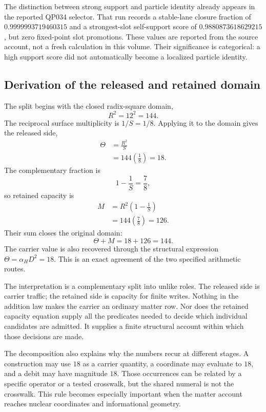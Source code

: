 The distinction between strong support and particle identity already appears in the reported QP034 selector. That run records a stable-lane closure fraction of $0.9999993719460315$ and a strongest-slot self-support score of $0.9880873618629215$, but zero fixed-point slot promotions. These values are reported from the source account, not a fresh calculation in this volume. Their significance is categorical: a high support score did not automatically become a localized particle identity.\cite{viireview}

\subsection{Derivation of the released and retained domain}

The split begins with the closed radix-square domain,
\begin{equation}
R^2=12^2=144.
\end{equation}
The reciprocal surface multiplicity is $1/S=1/8$. Applying it to the domain gives the released side,
\begin{align}
\Theta&=\frac{R^2}{S}\\
&=144\left(\frac18\right)=18.
\end{align}
The complementary fraction is
\begin{equation}
1-\frac1S=\frac78,
\end{equation}
so retained capacity is
\begin{align}
M&=R^2\left(1-\frac1S\right)\\
&=144\left(\frac78\right)=126.
\end{align}
Their sum closes the original domain:
\begin{equation}
\Theta+M=18+126=144.
\end{equation}
The carrier value is also recovered through the structural expression $\Theta=\alpha_HD^2=18$. This is an exact agreement of the two specified arithmetic routes.

The interpretation is a complementary split into unlike roles. The released side is carrier traffic; the retained side is capacity for finite writes. Nothing in the addition law makes the carrier an ordinary matter row. Nor does the retained capacity equation supply all the predicates needed to decide which individual candidates are admitted. It supplies a finite structural account within which those decisions are made.

The decomposition also explains why the numbers recur at different stages. A construction may use $18$ as a carrier quantity, a coordinate may evaluate to $18$, and a debit may have magnitude $18$. Those occurrences can be related by a specific operator or a tested crosswalk, but the shared numeral is not the crosswalk. This rule becomes especially important when the matter account reaches nuclear coordinates and informational geometry.

